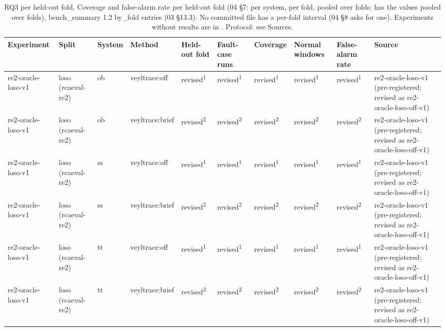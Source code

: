 \begin{table}[t]
\centering
\caption{RQ3 per held-out fold. Coverage and false-alarm rate per held-out fold (04 \S{}7: per system, per fold, pooled over folds;  has the values pooled over folds), bench\_summary 1.2 by\_fold entries (03 \S{}13.3). No committed file has a per-fold interval (04 \S{}8 asks for one). Experiments without results are in . Protocol: see Sources.}
\label{tab:t07b-rq3-folds}
\small
\begin{tabular}{llllllllll}
\hline
Experiment & Split & System & Method & Held-out fold & Fault-case runs & Coverage & Normal windows & False-alarm rate & Source \\
\hline
re2-oracle-loso-v1 & loso (rcaeval-re2) & ob & veyltrace:off & revised\textsuperscript{1} & revised\textsuperscript{1} & revised\textsuperscript{1} & revised\textsuperscript{1} & revised\textsuperscript{1} & re2-oracle-loso-v1 (pre-registered; revised as re2-oracle-loso-off-v1) \\
re2-oracle-loso-v1 & loso (rcaeval-re2) & ob & veyltrace:brief & revised\textsuperscript{2} & revised\textsuperscript{2} & revised\textsuperscript{2} & revised\textsuperscript{2} & revised\textsuperscript{2} & re2-oracle-loso-v1 (pre-registered; revised as re2-oracle-loso-off-v1) \\
re2-oracle-loso-v1 & loso (rcaeval-re2) & ss & veyltrace:off & revised\textsuperscript{1} & revised\textsuperscript{1} & revised\textsuperscript{1} & revised\textsuperscript{1} & revised\textsuperscript{1} & re2-oracle-loso-v1 (pre-registered; revised as re2-oracle-loso-off-v1) \\
re2-oracle-loso-v1 & loso (rcaeval-re2) & ss & veyltrace:brief & revised\textsuperscript{2} & revised\textsuperscript{2} & revised\textsuperscript{2} & revised\textsuperscript{2} & revised\textsuperscript{2} & re2-oracle-loso-v1 (pre-registered; revised as re2-oracle-loso-off-v1) \\
re2-oracle-loso-v1 & loso (rcaeval-re2) & tt & veyltrace:off & revised\textsuperscript{1} & revised\textsuperscript{1} & revised\textsuperscript{1} & revised\textsuperscript{1} & revised\textsuperscript{1} & re2-oracle-loso-v1 (pre-registered; revised as re2-oracle-loso-off-v1) \\
re2-oracle-loso-v1 & loso (rcaeval-re2) & tt & veyltrace:brief & revised\textsuperscript{2} & revised\textsuperscript{2} & revised\textsuperscript{2} & revised\textsuperscript{2} & revised\textsuperscript{2} & re2-oracle-loso-v1 (pre-registered; revised as re2-oracle-loso-off-v1) \\

\end{tabular}
\end{table}
